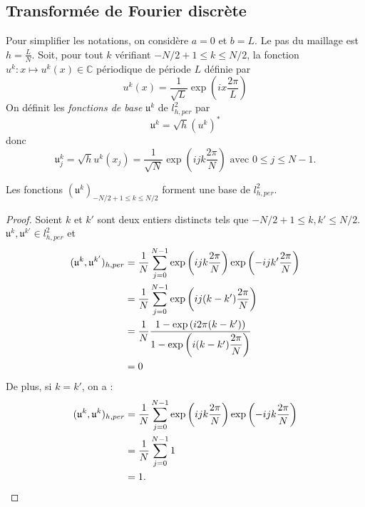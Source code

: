 \subsection{Transformée de Fourier discrète}

Pour simplifier les notations, on considère $a=0$ et $b=L$. Le pas du maillage est $h = \frac{L}{N}$.
Soit, pour tout $k$ vérifiant $-N/2+1 \leq k \leq N/2$, la fonction $u^k : x \mapsto u^k(x) \in \mathbb{C}$ périodique de période $L$ définie par 
\begin{equation}
u^k(x) = \dfrac{1}{\sqrt{L}} \exp \left( i x \dfrac{2 \pi}{L} \right)
\end{equation}
On définit les \textit{fonctions de base} $\mathfrak{u}^k$ de $l^2_{h,per}$ par
\begin{equation}
\mathfrak{u}^k = \sqrt{h} (u^k)^*
\end{equation}
donc 
\begin{equation}
\mathfrak{u}^k_j = \sqrt{h}  u^k(x_j) = \dfrac{1}{\sqrt{N}} \exp \left( i j k \dfrac{2 \pi}{N} \right) \text{ avec } 0 \leq j \leq N-1.
\label{eq:base_fourier_disc}
\end{equation}


\begin{proposition}
Les fonctions $(\mathfrak{u}^k)_{-N/2+1 \leq k \leq N/2}$ forment une base de $l^2_{h,per}$.
\end{proposition}

\begin{proof}
Soient $k$ et $k'$ sont deux entiers distincts tels que $-N/2+1 \leq k, k' \leq N/2$. $\mathfrak{u}^k, \mathfrak{u}^{k'} \in l^2_{h,per}$ et
\begin{align*}
(\mathfrak{u}^k, \mathfrak{u}^{k'})_{h,per} & = \dfrac{1}{N} \displaystyle\sum\limits_{j=0}^{N-1} \exp \left( i j k \dfrac{2 \pi}{N} \right) \exp \left( -i j k' \dfrac{2 \pi}{N} \right) \\
		& = \dfrac{1}{N} \displaystyle\sum\limits_{j=0}^{N-1} \exp \left( i j (k-k') \dfrac{2 \pi}{N} \right)\\
		& = \dfrac{1}{N} \dfrac{1 - \exp \left( i 2 \pi (k-k') \right)}{1 - \exp \left( i (k-k') \dfrac{2 \pi}{N}  \right)} \\
		& = 0
\end{align*}
De plus, si $k=k'$, on a :
\begin{align*}
(\mathfrak{u}^k, \mathfrak{u}^{k})_{h,per} & = \dfrac{1}{N} \displaystyle\sum\limits_{j=0}^{N-1} \exp \left( i j k \dfrac{2 \pi}{N} \right) \exp \left( -i j k \dfrac{2 \pi}{N} \right) \\
		& = \dfrac{1}{N} \displaystyle\sum\limits_{j=0}^{N-1} 1 \\
		& = 1.
\end{align*}
\end{proof}

